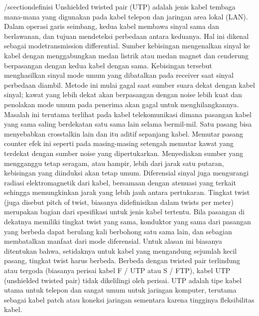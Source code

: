 /scection{definisi}
Unshielded twisted pair (UTP) adalah jenis kabel tembaga mana-mana yang digunakan pada kabel telepon dan jaringan area lokal (LAN).
Dalam operasi garis seimbang, kedua kabel membawa sinyal sama dan berlawanan, dan tujuan mendeteksi perbedaan antara keduanya. Hal ini dikenal sebagai modetransmission differential. Sumber kebisingan mengenalkan sinyal ke kabel dengan menggabungkan medan listrik atau medan magnet dan cenderung berpasangan dengan kedua kabel dengan sama. Kebisingan tersebut menghasilkan sinyal mode umum yang dibatalkan pada receiver saat sinyal perbedaan diambil. Metode ini mulai gagal saat sumber suara dekat dengan kabel sinyal; kawat yang lebih dekat akan berpasangan dengan noise lebih kuat dan penolakan mode umum pada penerima akan gagal untuk menghilangkannya. Masalah ini terutama terlihat pada kabel telekomunikasi dimana pasangan kabel yang sama saling berdekatan satu sama lain selama bermil-mil. Satu pasang bisa menyebabkan crosstalkin lain dan itu aditif sepanjang kabel. Memutar pasang counter efek ini seperti pada masing-masing setengah memutar kawat yang terdekat dengan sumber noise yang dipertukarkan. Menyediakan sumber yang mengganggu tetap seragam, atau hampir, lebih dari jarak satu putaran, kebisingan yang diinduksi akan tetap umum. Diferensial sinyal juga mengurangi radiasi elektromagnetik dari kabel, bersamaan dengan atenuasi yang terkait sehingga memungkinkan jarak yang lebih jauh antara pertukaran. Tingkat twist (juga disebut pitch of twist, biasanya didefinisikan dalam twists per meter) merupakan bagian dari spesifikasi untuk jenis kabel tertentu. Bila pasangan di dekatnya memiliki tingkat twist yang sama, konduktor yang sama dari pasangan yang berbeda dapat berulang kali berbohong satu sama lain, dan sebagian membatalkan manfaat dari mode diferensial. Untuk alasan ini biasanya ditentukan bahwa, setidaknya untuk kabel yang mengandung sejumlah kecil pasang, tingkat twist harus berbeda. Berbeda dengan twisted pair terlindung atau tergoda (biasanya perisai kabel F / UTP atau S / FTP), kabel UTP (unshielded twisted pair) tidak dikelilingi oleh perisai. UTP adalah tipe kabel utama untuk telepon dan sangat umum untuk jaringan komputer, terutama sebagai kabel patch atau koneksi jaringan sementara karena tingginya fleksibilitas kabel.
